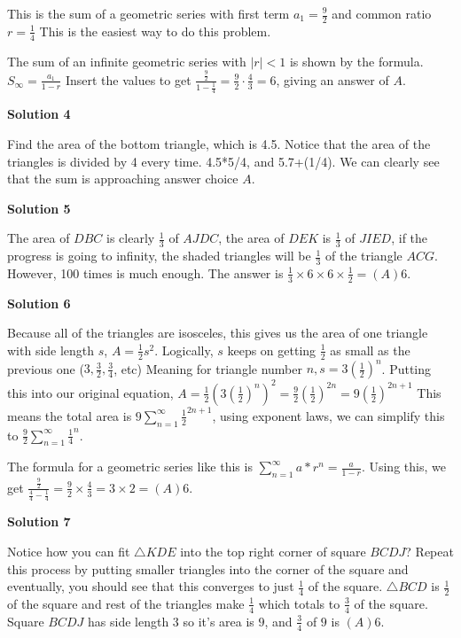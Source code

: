 \begin{enumerate}
 This is the sum of a geometric series with first term $a_1 = \frac{9}{2}$ and common ratio $r = \frac{1}{4}$ This is the easiest way to do this problem.

 The sum of an infinite geometric series with $|r|<1$ is shown by the formula. $S_{\infty} = \frac{a_1}{1 - r}$ Insert the values to get $\frac{\frac{9}{2}}{1 - \frac{1}{4}} = \frac{9}{2}\cdot\frac{4}{3} = 6$, giving an answer of $\boxed{A}$.

 



\textbf{Solution 4}

Find the area of the bottom triangle, which is 4.5. Notice that the area of the triangles is divided by 4 every time. 4.5*5/4, and 5.7+(1/4). We can clearly see that the sum is approaching answer choice $\boxed{A}$.

 



\textbf{Solution 5}

The area of $DBC$ is clearly $\frac{1}{3}$ of $AJDC$, the area of $DEK$ is $\frac{1}{3}$ of $JIED$, if the progress is going to infinity, the shaded triangles will be $\frac{1}{3}$ of the triangle $ACG$. However, 100 times is much enough. The answer is $\frac{1}{3}\times 6\times 6\times \frac{1}{2} = \boxed{(A)6}$.

 



\textbf{Solution 6}

Because all of the triangles are isosceles, this gives us the area of one triangle with side length $s$, $A = \frac{1}{2}s^2$. Logically, $s$ keeps on getting $\frac{1}{2}$ as small as the previous one ($3, \frac{3}{2}, \frac{3}{4}$, etc) Meaning for triangle number $n, s = 3(\frac{1}{2})^n$. Putting this into our original equation, $A = \frac{1}{2}(3(\frac{1}{2})^n)^2 = \frac{9}{2}(\frac{1}{2})^{2n} = 9(\frac{1}{2})^{2n+1}$ This means the total area is $9\sum^{\infty}_{n=1} \frac{1}{2}^{2n+1}$, using exponent laws, we can simplify this to $\frac{9}{2} \sum^{\infty}_{n=1} \frac{1}{4}^n$.

 The formula for a geometric series like this is $\sum^{\infty}_{n=1} a*r^n = \frac{a}{1-r}$. Using this, we get $\frac{\frac{9}{2}}{\frac{4}{4}-\frac{1}{4}} = \frac{9}{2}\times\frac{4}{3} = 3\times2 = \boxed{(A)6}$.

 



\textbf{Solution 7}

Notice how you can fit $\triangle KDE$ into the top right corner of square $BCDJ$? Repeat this process by putting smaller triangles into the corner of the square and eventually, you should see that this converges to just $\frac{1}{4}$ of the square. $\triangle BCD$ is $\frac{1}{2}$ of the square and rest of the triangles make $\frac{1}{4}$ which totals to $\frac{3}{4}$ of the square. Square $BCDJ$ has side length $3$ so it's area is $9$, and $\frac{3}{4}$ of $9$ is $\boxed{(A)6}$.


\end{enumerate}
